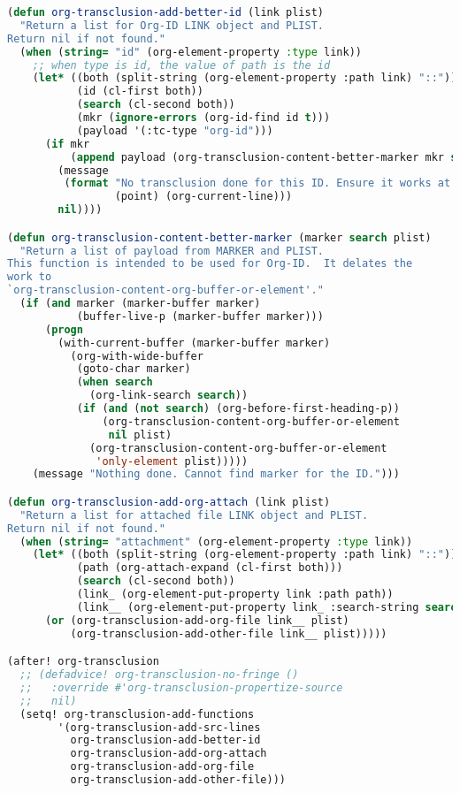 \documentclass[11pt]{article}
\begin{document}
\begin{enumerate}
\begin{lstlisting}[language=Lisp]
(defun org-transclusion-add-better-id (link plist)
  "Return a list for Org-ID LINK object and PLIST.
Return nil if not found."
  (when (string= "id" (org-element-property :type link))
    ;; when type is id, the value of path is the id
    (let* ((both (split-string (org-element-property :path link) "::"))
           (id (cl-first both))
           (search (cl-second both))
           (mkr (ignore-errors (org-id-find id t)))
           (payload '(:tc-type "org-id")))
      (if mkr
          (append payload (org-transclusion-content-better-marker mkr search plist))
        (message
         (format "No transclusion done for this ID. Ensure it works at point %d, line %d"
                 (point) (org-current-line)))
        nil))))

(defun org-transclusion-content-better-marker (marker search plist)
  "Return a list of payload from MARKER and PLIST.
This function is intended to be used for Org-ID.  It delates the
work to
`org-transclusion-content-org-buffer-or-element'."
  (if (and marker (marker-buffer marker)
           (buffer-live-p (marker-buffer marker)))
      (progn
        (with-current-buffer (marker-buffer marker)
          (org-with-wide-buffer
           (goto-char marker)
           (when search
             (org-link-search search))
           (if (and (not search) (org-before-first-heading-p))
               (org-transclusion-content-org-buffer-or-element
                nil plist)
             (org-transclusion-content-org-buffer-or-element
              'only-element plist)))))
    (message "Nothing done. Cannot find marker for the ID.")))

(defun org-transclusion-add-org-attach (link plist)
  "Return a list for attached file LINK object and PLIST.
Return nil if not found."
  (when (string= "attachment" (org-element-property :type link))
    (let* ((both (split-string (org-element-property :path link) "::"))
           (path (org-attach-expand (cl-first both)))
           (search (cl-second both))
           (link_ (org-element-put-property link :path path))
           (link__ (org-element-put-property link_ :search-string search)))
      (or (org-transclusion-add-org-file link__ plist)
          (org-transclusion-add-other-file link__ plist)))))

(after! org-transclusion
  ;; (defadvice! org-transclusion-no-fringe ()
  ;;   :override #'org-transclusion-propertize-source
  ;;   nil)
  (setq! org-transclusion-add-functions
        '(org-transclusion-add-src-lines
          org-transclusion-add-better-id
          org-transclusion-add-org-attach
          org-transclusion-add-org-file
          org-transclusion-add-other-file)))
\end{lstlisting}
\end{enumerate}
\end{document}
